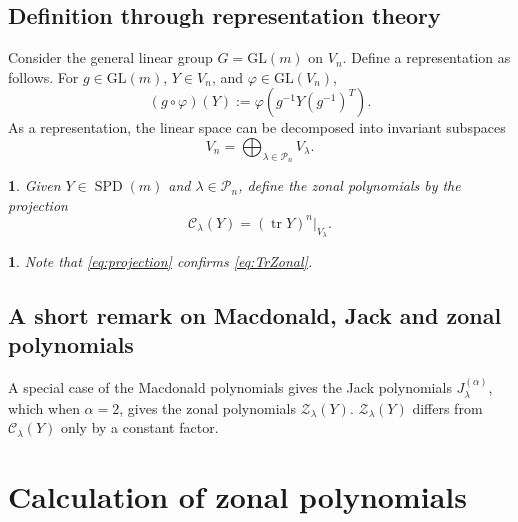 \documentclass[smallextended]{svjour3}
\newtheorem{defn}[thm]{\protect\definitionname}
\newtheorem{rem}[thm]{\protect\remarkname}
\DeclareMathOperator{\Tr}{tr}
\newcommand{\SPD}{\operatorname{SPD}}
\providecommand{\definitionname}{Definition}
\providecommand{\remarkname}{Remark}
\begin{document}
\subsection{Definition through representation theory}

Consider the general linear group $G=\mathrm{GL}(m)$ on
$V_{n}$. Define a representation as follows. For $g\in\mathrm{GL}(m)$, $Y\in V_n$, and $\varphi\in\mathrm{GL}(V_n)$, 
\[
\left(g\circ\varphi\right)(Y):=\varphi\left(g^{-1}Y\left(g^{-1}\right)^{T}\right).
\]
As a representation, the linear space can be decomposed into invariant
subspaces \cite[p.~611]{Representation}
\[
V_{n}=\bigoplus_{\lambda\in\mathcal{P}_{n}}V_{\lambda}.
\]

\begin{defn}
Given $Y\in \SPD(m)$ and $\lambda\in\mathcal{P}_{n}$, define the zonal polynomials by
the projection
\begin{equation}
\mathcal{C}_{\lambda}(Y)=(\Tr Y)^{n}\Big|_{V_{\lambda}}.\label{eq:projection}
\end{equation}
\end{defn}
\begin{rem}
Note that \eqref{eq:projection} confirms \eqref{eq:TrZonal}. 
\end{rem}

\subsection{A short remark on Macdonald, Jack and zonal polynomials}

A special case of the Macdonald polynomials gives the Jack polynomials $J_{\lambda}^{(\alpha)}$,
which when $\alpha=2$, gives the zonal polynomials $\mathcal{Z}_\lambda(Y)$. $\mathcal{Z}_\lambda(Y)$ differs from $\mathcal{C}_\lambda(Y)$ only by a constant factor. 

\section{Calculation of zonal polynomials}\label{sec:calc}
\end{document}
